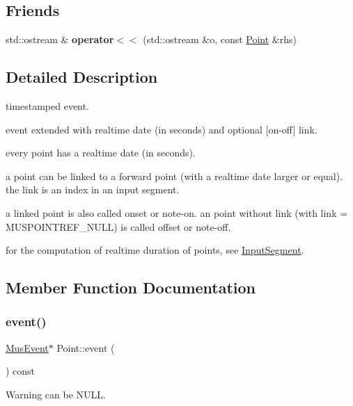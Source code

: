 \subsection*{Friends}
\begin{DoxyCompactItemize}
\item 
\mbox{\label{classPoint_ad95cc714e40b63c5df8e1dc41305178e}} 
std\+::ostream \& {\bfseries operator$<$$<$} (std\+::ostream \&o, const \mbox{\hyperlink{classPoint}{Point}} \&rhs)
\end{DoxyCompactItemize}


\subsection{Detailed Description}
timestamped event. 

event extended with realtime date (in seconds) and optional \mbox{[}on-\/off\mbox{]} link.

every point has a realtime date (in seconds).

a point can be linked to a forward point (with a realtime date larger or equal). the link is an index in an input segment.

a linked point is also called onset or note-\/on. an point without link (with link = M\+U\+S\+P\+O\+I\+N\+T\+R\+E\+F\+\_\+\+N\+U\+LL) is called offset or note-\/off.

for the computation of realtime duration of points, see \mbox{\hyperlink{classInputSegment}{Input\+Segment}}. 

\subsection{Member Function Documentation}
\mbox{\label{classPoint_acf6506d97b9e96f177e1830a546e3ea3}} 
\subsubsection{\texorpdfstring{event()}{event()}}
{\footnotesize\ttfamily \mbox{\hyperlink{classMusEvent}{Mus\+Event}}$\ast$ Point\+::event (\begin{DoxyParamCaption}{ }\end{DoxyParamCaption}) const\hspace{0.3cm}{\ttfamily [inline]}}

\begin{DoxyWarning}{Warning}
can be N\+U\+LL. 
\end{DoxyWarning}
\mbox{\label{classPoint_a21ee97f153dd1c435f7d2e554887294f}} 
